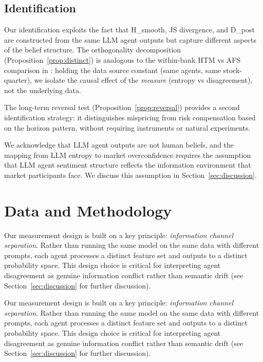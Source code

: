 \documentclass[12pt,a4paper]{article}
\begin{document}
\subsection{Identification}

Our identification exploits the fact that H\_smooth, JS divergence, and D\_post are constructed from the same LLM agent outputs but capture different aspects of the belief structure. The orthogonality decomposition (Proposition~\ref{prop:distinct}) is analogous to the within-bank HTM vs AFS comparison in \citet{Zhang2026fomc}: holding the data source constant (same agents, same stock-quarter), we isolate the causal effect of the \textit{measure} (entropy vs disagreement), not the underlying data.

The long-term reversal test (Proposition~\ref{prop:reversal}) provides a second identification strategy: it distinguishes mispricing from risk compensation based on the horizon pattern, without requiring instruments or natural experiments.

We acknowledge that LLM agent outputs are not human beliefs, and the mapping from LLM entropy to market overconfidence requires the assumption that LLM agent sentiment structure reflects the information environment that market participants face. We discuss this assumption in Section~\ref{sec:discussion}.

\section{Data and Methodology}\label{sec:data}

Our measurement design is built on a key principle: \textit{information channel separation}. Rather than running the same model on the same data with different prompts, each agent processes a distinct feature set and outputs to a distinct probability space. This design choice is critical for interpreting agent disagreement as genuine information conflict rather than semantic drift (see Section~\ref{sec:discussion} for further discussion).

Our measurement design is built on a key principle: \textit{information channel separation}. Rather than running the same model on the same data with different prompts, each agent processes a distinct feature set and outputs to a distinct probability space. This design choice is critical for interpreting agent disagreement as genuine information conflict rather than semantic drift (see Section~\ref{sec:discussion} for further discussion).
\end{document}
